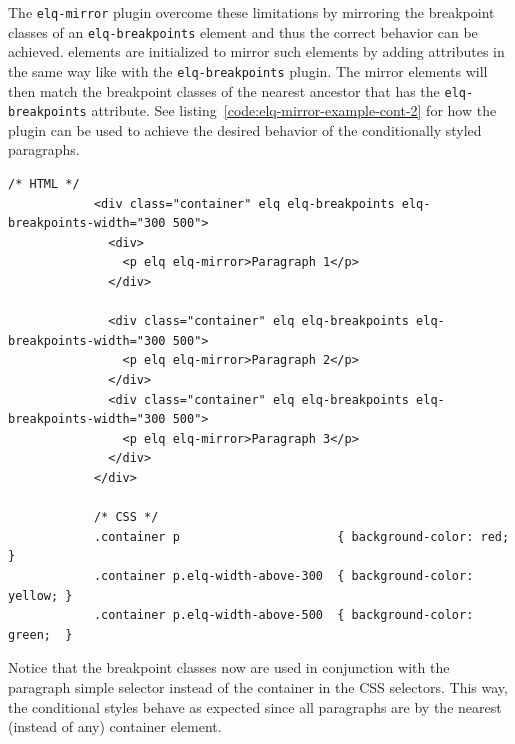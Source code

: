 \documentclass[a4paper,11pt]{kth-mag}
\newcommand{\code}[1]{\texttt{#1}}
\begin{document}
          The \code{elq-mirror} plugin overcome these limitations by mirroring the breakpoint classes of an \code{elq-breakpoints} element and thus the correct behavior can be achieved.
          \Glspl{element} are initialized to mirror such \glspl{element} by adding attributes in the same way like with the \code{elq-breakpoints} plugin.
          The mirror \glspl{element} will then match the breakpoint classes of the nearest ancestor that has the \code{elq-breakpoints} attribute.
          See listing~\ref{code:elq-mirror-example-cont-2} for how the plugin can be used to achieve the desired behavior of the conditionally styled paragraphs.
          \begin{lstlisting}[gobble=12,caption={By using the \code{elq-mirror} plugin to overcome the limitations of CSS, the correct behavior can be achieved of the conditionally styled paragraphs.},captionpos=b,label={code:elq-mirror-example-cont-2}]
            /* HTML */
            <div class="container" elq elq-breakpoints elq-breakpoints-width="300 500">
              <div>
                <p elq elq-mirror>Paragraph 1</p>
              </div>

              <div class="container" elq elq-breakpoints elq-breakpoints-width="300 500">
                <p elq elq-mirror>Paragraph 2</p>
              </div>
              <div class="container" elq elq-breakpoints elq-breakpoints-width="300 500">
                <p elq elq-mirror>Paragraph 3</p>
              </div>
            </div>

            /* CSS */
            .container p                      { background-color: red;    }
            .container p.elq-width-above-300  { background-color: yellow; }
            .container p.elq-width-above-500  { background-color: green;  }
          \end{lstlisting}
          Notice that the breakpoint classes now are used in conjunction with the paragraph simple selector instead of the container in the CSS selectors.
          This way, the conditional styles behave as expected since all paragraphs are by the nearest (instead of any) container \gls{element}.
\end{document}
